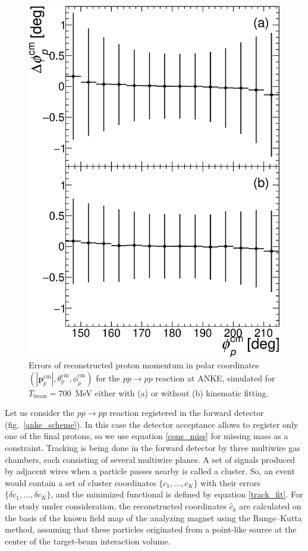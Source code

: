 \begin{figure}[hbp]
\includegraphics[height=0.3\textheight]{pics/drawPhi.eps}
\caption{
Errors of reconstructed proton momentum in polar coordinates $(|\boldsymbol{p}_p^\mathrm{cm}|, \theta_p^\mathrm{cm}, \phi_p^\mathrm{cm})$ for the $pp \to pp$ reaction at ANKE, simulated for $T_\mathrm{beam} = 700$~MeV either with (a) or without (b) kinematic fitting.
}
\label{anke_errs}
\end{figure}

Let us consider the $pp \to pp$ reaction registered in the forward detector (fig.~\ref{anke_scheme}).
In this case the detector acceptance allows to register only one of the final protons, so we use equation \eqref{cons_miss} for missing mass as a constraint.
Tracking is being done in the forward detector by three multiwire gas chambers, each consisting of several multiwire planes.
A set of signals produced by adjacent wires when a particle passes nearby is called a cluster.
So, an event would contain a set of cluster coordinates $\{c_1, \ldots, c_K\}$ with their errors $\{\delta c_1, \ldots, \delta c_K\}$, and the minimized functional is defined by equation \eqref{track_fit}.
For the study under consideration, the reconstructed coordinates $\hat{c}_k$ are calculated on the basis of the known field map of the analyzing magnet using the Runge–Kutta method, assuming that these particles originated from a point-like source at the center of the target-beam interaction volume.


